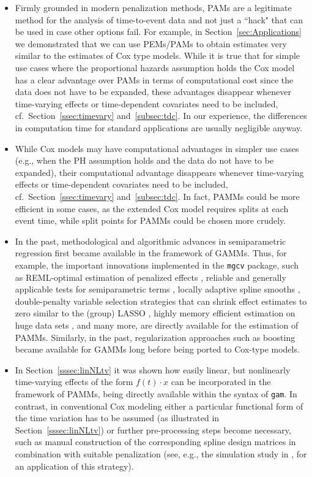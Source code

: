 \documentclass[submit]{smj}
\newcommand{\code}[1]{{\small \texttt{#1}}}
\begin{document}
\begin{itemize}
\item Firmly grounded in modern penalization methods, PAMs are a legitimate
method for the analysis of time-to-event data and not just a ``hack" that can
be used in case other options fail. For example, in Section~\ref{sec:Applications}
we demonstrated that we can use PEMs/PAMs to obtain estimates very similar to the
estimates of Cox type models.
While it is true that for simple use cases where the proportional hazards
assumption holds
the Cox model has a clear advantage over PAMs in terms of computational cost
since the data does not have to be expanded, these advantages disappear whenever
time-varying effects or time-dependent covariates need to be included,
cf.~Section~\ref{ssec:timevary} and~\ref{subsec:tdc}.
In our experience, the differences in computation time for standard
applications are usually negligible anyway.

\item While Cox models may have
computational advantages in simpler use cases (e.g., when the PH assumption holds
and the data do not have to be expanded), their computational advantage
disappears whenever time-varying effects or time-dependent covariates need to
be included, cf.~Section~\ref{ssec:timevary} and~\ref{subsec:tdc}. In fact,
PAMMs could be more efficient in some cases, as the extended Cox model
requires splits at each event time, while split points for PAMMs could be
chosen more crudely.

\item In the past, methodological and algorithmic advances in
semiparametric regression first became available in the framework of GAMMs.
Thus, for example, the important innovations implemented in the \code{mgcv} package,
such as REML-optimal estimation of penalized effects \citep{Wood2016b},
reliable and generally applicable tests for semiparametric terms \citep{Wood2012},
locally adaptive spline smooths \citep{Wood:2011}, double-penalty variable
selection strategies that can shrink effect estimates to zero \citep{Marra2011}
similar to the (group) LASSO \citep{MeiGeeBue:2008},
highly memory efficient estimation on huge data sets \citep{Wood2016},
and many more, are directly available for the estimation of PAMMs.
Similarly, in the past, regularization approaches such as boosting became available
for GAMMs long before being ported to Cox-type models.

\item In Section~\ref{sssec:linNLtv} it was shown how easily linear,
but nonlinearly time-varying effects of the form $f(t)\cdot x$ can be
incorporated in the framework of PAMMs, being directly available within the
syntax of \texttt{gam}. In contrast, in conventional Cox modeling either a
particular functional form of the time variation has to be assumed
(as illustrated in Section~\ref{sssec:linNLtv}) or further pre-processing steps
become necessary, such as manual construction of the corresponding spline design
matrices in combination with suitable penalization (see, e.g., the simulation
study in \citealp{GroHasTut:2017}, for an application
of this strategy).


\end{itemize}
\end{document}
